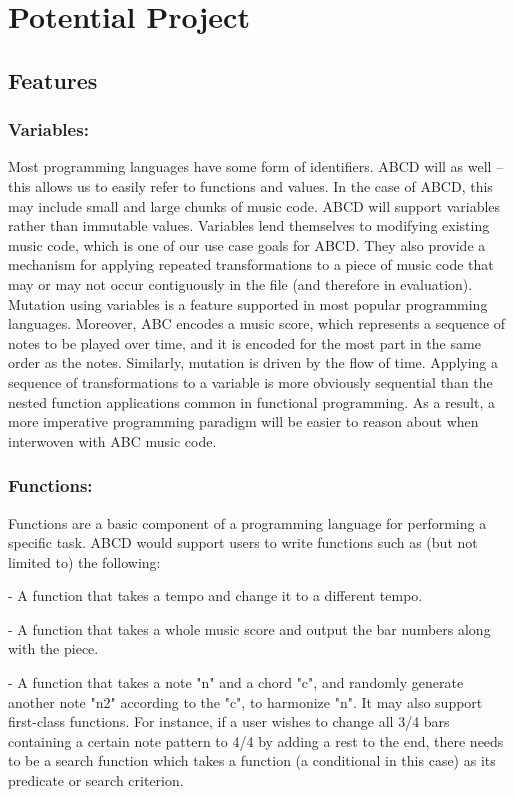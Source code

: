 \section{Potential Project}

\subsection{Features}
    \subsubsection{Variables:}
    Most programming languages have some form of identifiers. ABCD will as well -- this allows us to easily refer to functions and values. In the case of ABCD, this may include small and large chunks of music code. ABCD will support variables rather than immutable values. Variables lend themselves to modifying existing music code, which is one of our use case goals for ABCD. They also provide a mechanism for applying repeated transformations to a piece of music code that may or may not occur contiguously in the file (and therefore in evaluation). Mutation using variables is a feature supported in most popular programming languages. Moreover, ABC encodes a music score, which represents a sequence of notes to be played over time, and it is encoded for the most part in the same order as the notes. Similarly, mutation is driven by the flow of time. Applying a sequence of transformations to a variable is more obviously sequential than the nested function applications common in functional programming. As a result, a more imperative programming paradigm will be easier to reason about when interwoven with ABC music code.

    \subsubsection{Functions:}
    Functions are a basic component of a programming language for performing a specific task. ABCD would support users to write functions such as (but not limited to) the following:

    - A function that takes a tempo and change it to a different tempo.

    - A function that takes a whole music score and output the bar numbers along with the piece.
    
    - A function that takes a note "n" and a chord "c", and randomly generate another note "n2" according to the "c", to harmonize "n".
      It may also support first-class functions. For instance, if a user wishes to change all 3/4 bars containing a certain note pattern to 4/4 by adding a rest to the end, there needs to be a search function which takes a function (a conditional in this case) as its predicate or search criterion. 


